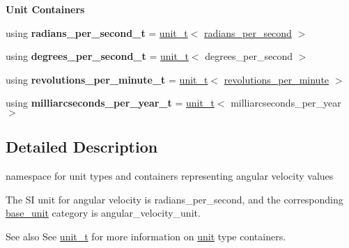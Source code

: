 \begin{Indent}{\bf Unit Containers}\par
{\em \label{namespaceunits_1_1angular__velocity_angularVelocityContainers}%
\hypertarget{namespaceunits_1_1angular__velocity_angularVelocityContainers}{}%
}\begin{DoxyCompactItemize}
\item 
\hypertarget{namespaceunits_1_1angular__velocity_a46548405f8fa1262c03899efeafd3ce4}{}using {\bfseries radians\+\_\+per\+\_\+second\+\_\+t} = \hyperlink{classunits_1_1unit__t}{unit\+\_\+t}$<$ \hyperlink{structunits_1_1unit}{radians\+\_\+per\+\_\+second} $>$\label{namespaceunits_1_1angular__velocity_a46548405f8fa1262c03899efeafd3ce4}

\item 
\hypertarget{namespaceunits_1_1angular__velocity_a2beb7452565e3ed5a6d5c91358abfeec}{}using {\bfseries degrees\+\_\+per\+\_\+second\+\_\+t} = \hyperlink{classunits_1_1unit__t}{unit\+\_\+t}$<$ degrees\+\_\+per\+\_\+second $>$\label{namespaceunits_1_1angular__velocity_a2beb7452565e3ed5a6d5c91358abfeec}

\item 
\hypertarget{namespaceunits_1_1angular__velocity_a0bfeb8148c682d09c1061211e5cad97b}{}using {\bfseries revolutions\+\_\+per\+\_\+minute\+\_\+t} = \hyperlink{classunits_1_1unit__t}{unit\+\_\+t}$<$ \hyperlink{structunits_1_1unit}{revolutions\+\_\+per\+\_\+minute} $>$\label{namespaceunits_1_1angular__velocity_a0bfeb8148c682d09c1061211e5cad97b}

\item 
\hypertarget{namespaceunits_1_1angular__velocity_a785f1e21ea866fa68dc91868c114aa2e}{}using {\bfseries milliarcseconds\+\_\+per\+\_\+year\+\_\+t} = \hyperlink{classunits_1_1unit__t}{unit\+\_\+t}$<$ milliarcseconds\+\_\+per\+\_\+year $>$\label{namespaceunits_1_1angular__velocity_a785f1e21ea866fa68dc91868c114aa2e}

\end{DoxyCompactItemize}
\end{Indent}


\subsection{Detailed Description}
namespace for unit types and containers representing angular velocity values 

The S\+I unit for angular velocity is {\ttfamily radians\+\_\+per\+\_\+second}, and the corresponding {\ttfamily \hyperlink{structunits_1_1base__unit}{base\+\_\+unit}} category is {\ttfamily angular\+\_\+velocity\+\_\+unit}. \begin{DoxySeeAlso}{See also}
See \hyperlink{classunits_1_1unit__t}{unit\+\_\+t} for more information on \hyperlink{structunits_1_1unit}{unit} type containers. 
\end{DoxySeeAlso}
